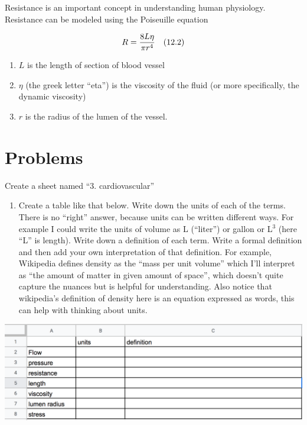 \documentclass[]{book}
\providecommand{\tightlist}{%
  \setlength{\itemsep}{0pt}\setlength{\parskip}{0pt}}
\begin{document}
Resistance is an important concept in understanding human physiology.
Resistance can be modeled using the Poiseuille equation

\begin{equation}
R = \frac{8L\eta}{\pi r^4} \quad \small{(12.2)}
\end{equation}

\begin{enumerate}
\def\labelenumi{\arabic{enumi}.}
\tightlist
\item
  \(L\) is the length of section of blood vessel
\item
  \(\eta\) (the greek letter ``eta'') is the viscosity of the fluid (or
  more specifically, the dynamic viscosity)
\item
  \(r\) is the radius of the lumen of the vessel.
\end{enumerate}

\section{Problems}\label{problems}

Create a sheet named ``3. cardiovascular''

\begin{enumerate}
\def\labelenumi{\arabic{enumi}.}
\tightlist
\item
  Create a table like that below. Write down the units of each of the
  terms. There is no ``right'' answer, because units can be written
  different ways. For example I could write the units of volume as L
  (``liter'') or gallon or L\(^3\) (here ``L'' is length). Write down a
  definition of each term. Write a formal definition and then add your
  own interpretation of that definition. For example, Wikipedia defines
  density as the ``mass per unit volume'' which I'll interpret as ``the
  amount of matter in given amount of space'', which doesn't quite
  capture the nuances but is helpful for understanding. Also notice that
  wikipedia's definition of density here is an equation expressed as
  words, this can help with thinking about units.
\end{enumerate}

\includegraphics{images/flow_table.png}
\end{document}
